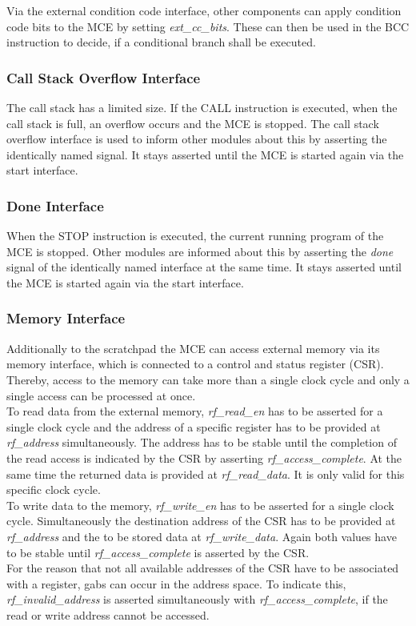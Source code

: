 Via the external condition code interface, other components can apply condition code bits to the MCE by setting \emph{ext\_cc\_bits}.
These can then be used in the BCC instruction to decide, if a conditional branch shall be executed.

\subsubsection{Call Stack Overflow Interface}

The call stack has a limited size.
If the CALL instruction is executed, when the call stack is full, an overflow occurs and the MCE is stopped.
The call stack overflow interface is used to inform other modules about this by asserting the identically named signal.
It stays asserted until the MCE is started again via the start interface.

\subsubsection{Done Interface}

When the STOP instruction is executed, the current running program of the MCE is stopped.
Other modules are informed about this by asserting the \emph{done} signal of the identically named interface at the same time.
It stays asserted until the MCE is started again via the start interface.

\subsubsection{Memory Interface}\label{mem_inf}

Additionally to the scratchpad the MCE can access external memory via its memory interface, which is connected to a control and status register (CSR).
Thereby, access to the memory can take more than a single clock cycle and only a single access can be processed at once.\\
To read data from the external memory, \emph{rf\_read\_en} has to be asserted for a single clock cycle and the address of a specific register has to be provided at \emph{rf\_address} simultaneously.
The address has to be stable until the completion of the read access is indicated by the CSR by asserting \emph{rf\_access\_complete}.
At the same time the returned data is provided at \emph{rf\_read\_data}.
It is only valid for this specific clock cycle.\\
To write data to the memory, \emph{rf\_write\_en} has to be asserted for a single clock cycle.
Simultaneously the destination address of the CSR has to be provided at \emph{rf\_address} and the to be stored data at \emph{rf\_write\_data}.
Again both values have to be stable until \emph{rf\_access\_complete} is asserted by the CSR.\\
For the reason that not all available addresses of the CSR have to be associated with a register, gabs can occur in the address space.
To indicate this, \emph{rf\_invalid\_address} is asserted simultaneously with \emph{rf\_access\_complete}, if the read or write address cannot be accessed.



